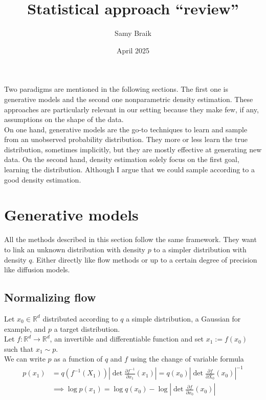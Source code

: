 \documentclass{article}
\title{Statistical approach ``review''}
\author{Samy Braik}
\date{April 2025}
\begin{document}
\maketitle

Two paradigms are mentioned in the following sections. The first one is generative models and the second one nonparametric density estimation. These approaches are particularly relevant in our setting because they make few, if any, assumptions on the shape of the data. \\
On one hand, generative models are the go-to techniques to learn and sample from an unobserved probability distribution. They more or less learn the true distribution, sometimes implicitly, but they are mostly effective at generating new data. On the second hand, density estimation solely focus on the first goal, learning the distribution. Although I argue that we could sample according to a good density estimation.

\section{Generative models}
All the methods described in this section follow the same framework. They want to link an unknown distribution with density \(p\) to a simpler distribution with density \(q\). Either directly like flow methods or up to a certain degree of precision like diffusion models.
\subsection{Normalizing flow}
Let \(x_0\in\mathbb{R}^d\) distributed according to \(q\) a simple distribution, a Gaussian for example, and \(p\) a target distribution.
\\
Let \(f:\mathbb{R}^d\rightarrow\mathbb{R}^d\), an invertible and differentiable function and set \(x_1:=f(x_0)\) such that \(x_1\sim p\). \\
We can write \(p\) as a function of \(q\) and \(f\) using the change of variable formula 
\begin{align}
    p(x_1)&=q(f^{-1}(X_1))\left| \det\frac{\partial f^{-1}}{\partial x_1}(x_1) \right| = q(x_0)\left| \det \frac{\partial f}{\partial X_0}(x_0) \right|^{-1} \\
    &\implies \log p(x_1)=\log q(x_0) - \log \left|  \det \frac{\partial f}{\partial x_0}(x_0) \right|  
\end{align}
\end{document}
